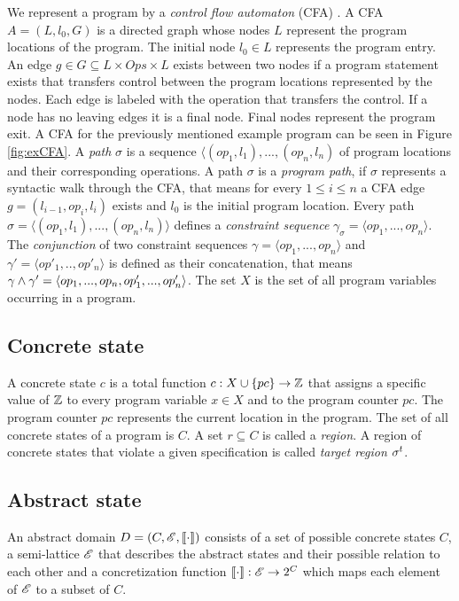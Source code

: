 We represent a program by a \emph{control flow automaton} (CFA) \cite{BeyerBook}\cite{Beyer2012}.
A CFA $A = (L, l_0, G)$ is a directed graph whose nodes $L$ represent the program locations of the program.
The initial node $l_0 \in L$ represents the program entry.
An edge $g \in G \subseteq L \times Ops \times L$ exists between two nodes if a program statement exists that transfers control between the program locations represented by the nodes.
Each edge is labeled with the operation that transfers the control.
If a node has no leaving edges it is a final node. Final nodes represent the program exit.
A CFA for the previously mentioned example program can be seen in Figure \ref{fig:exCFA}.
A \emph{path} $\sigma$ \cite{Beyer2015} is a sequence $\langle (op_1, l_1), ..., (op_n, l_n)$ of program locations and their corresponding operations.
A path $\sigma$ is a \emph{program path}, if $\sigma$ represents a syntactic walk through the CFA, that means for every $1 \leq i \leq n$ a CFA edge $g = (l_{i-1}, op_i, l_i)$ exists and $l_0$ is the initial program location.
Every path $\sigma = \langle (op_1, l_1), ..., (op_n, l_n) \rangle$ defines a \emph{constraint sequence} $\gamma_\sigma = \langle op_1, ..., op_n \rangle$.
The \emph{conjunction} of two constraint sequences $\gamma = \langle op_1, ..., op_n \rangle$ and $\gamma' = \langle op'_1, .., op'_n \rangle$ is defined as their concatenation,
that means $\gamma \wedge \gamma' = \langle op_1, ..., op_n, op'_1, ..., op'_n \rangle$.
The set $X$ is the set of all program variables occurring in a program.

\subsection{Concrete state}
A concrete state $c$ is a total function $c: X \cup \{pc\} \rightarrow \mathbb{Z}$ that assigns a specific value of $\mathbb{Z}$ to every program variable $x \in X$ and to the program counter $pc$. The program counter $pc$ represents the current location in the program.
The set of all concrete states of a program is $C$. A set $r \subseteq C$ is called a \emph{region}.
A region of concrete states that violate a given specification is called \emph{target region} $\sigma^{t}$.

\subsection{Abstract state}
\label{sec:abstractState}
An abstract domain \cite{Beyer2007} $D = (C, \mathscr{E}, \llbracket \cdot \rrbracket)$ consists of a set of possible concrete states $C$, a semi-lattice $\mathscr{E}$ that describes the abstract states and their possible relation to each other and a concretization function $\llbracket \cdot \rrbracket : \mathscr{E} \rightarrow 2^C$ which maps each element of $\mathscr{E}$ to a subset of $C$.

